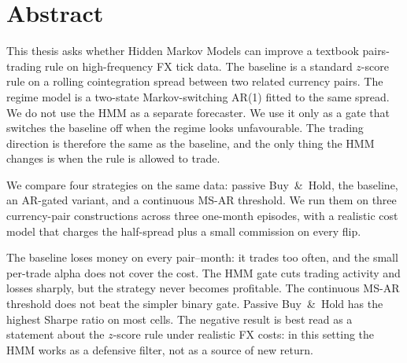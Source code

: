 \section*{Abstract}

This thesis asks whether Hidden Markov Models can improve a textbook pairs-trading rule on high-frequency FX tick data. The baseline is a standard $z$-score rule on a rolling cointegration spread between two related currency pairs. The regime model is a two-state Markov-switching AR(1) fitted to the same spread. We do not use the HMM as a separate forecaster. We use it only as a gate that switches the baseline off when the regime looks unfavourable. The trading direction is therefore the same as the baseline, and the only thing the HMM changes is when the rule is allowed to trade.

We compare four strategies on the same data: passive Buy~\&~Hold, the baseline, an AR-gated variant, and a continuous MS-AR threshold. We run them on three currency-pair constructions across three one-month episodes, with a realistic cost model that charges the half-spread plus a small commission on every flip.

The baseline loses money on every pair--month: it trades too often, and the small per-trade alpha does not cover the cost. The HMM gate cuts trading activity and losses sharply, but the strategy never becomes profitable. The continuous MS-AR threshold does not beat the simpler binary gate. Passive Buy~\&~Hold has the highest Sharpe ratio on most cells. The negative result is best read as a statement about the $z$-score rule under realistic FX costs: in this setting the HMM works as a defensive filter, not as a source of new return.
